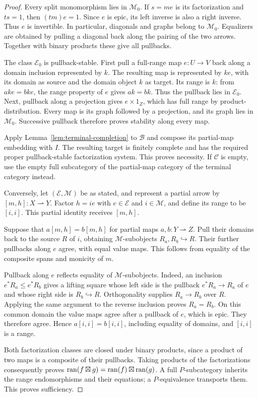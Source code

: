 \documentclass[11pt]{article}
\newcommand{\C}{\mathcal C}\newcommand{\D}{\mathcal D}\newcommand{\B}{\mathcal B}
\begin{document}
\begin{proof}
Every split monomorphism lies in $\mathcal M_0$. If $s=me$ is its factorization and $ts=1$, then $(tm)e=1$. Since $e$ is epic, its left inverse is also a right inverse. Thus $e$ is invertible. In particular, diagonals and graphs belong to $\mathcal M_0$. Equalizers are obtained by pulling a diagonal back along the pairing of the two arrows. Together with binary products these give all pullbacks.

The class $\mathcal E_0$ is pullback-stable. First pull a full-range map $e:U\to V$ back along a domain inclusion represented by $k$. The resulting map is represented by $ke$, with its domain as source and the domain object $k$ as target. Its range is $k$: from $ake=bke$, the range property of $e$ gives $ak=bk$. Thus the pullback lies in $\mathcal E_0$. Next, pullback along a projection gives $e\times1_Z$, which has full range by product-distribution. Every map is its graph followed by a projection, and its graph lies in $\mathcal M_0$. Successive pullback therefore proves stability along every map.

Apply Lemma~\ref{lem:terminal-completion} to $\mathcal B$ and compose its partial-map embedding with $I$. The resulting target is finitely complete and has the required proper pullback-stable factorization system. This proves necessity. If $\C$ is empty, use the empty full subcategory of the partial-map category of the terminal category instead.

Conversely, let $(\mathcal E,\mathcal M)$ be as stated, and represent a partial arrow by $[m,h]:X\rightharpoonup Y$. Factor $h=ie$ with $e\in\mathcal E$ and $i\in\mathcal M$, and define its range to be $[i,i]$. This partial identity receives $[m,h]$.

Suppose that $a[m,h]=b[m,h]$ for partial maps $a,b:Y\rightharpoonup Z$. Pull their domains back to the source $R$ of $i$, obtaining $\mathcal M$-subobjects $R_a,R_b\hookrightarrow R$. Their further pullbacks along $e$ agree, with equal value maps. This follows from equality of the composite spans and monicity of $m$.

Pullback along $e$ reflects equality of $\mathcal M$-subobjects. Indeed, an inclusion $e^*R_a\leq e^*R_b$ gives a lifting square whose left side is the pullback $e^*R_a\to R_a$ of $e$ and whose right side is $R_b\hookrightarrow R$. Orthogonality supplies $R_a\to R_b$ over $R$. Applying the same argument to the reverse inclusion proves $R_a=R_b$. On this common domain the value maps agree after a pullback of $e$, which is epic. They therefore agree. Hence $a[i,i]=b[i,i]$, including equality of domains, and $[i,i]$ is a range.

Both factorization classes are closed under binary products, since a product of two maps is a composite of their pullbacks. Taking products of the factorizations consequently proves
$\operatorname{ran}(f\boxtimes g)=\operatorname{ran}(f)\boxtimes\operatorname{ran}(g)$.
A full $P$-subcategory inherits the range endomorphisms and their equations; a $P$-equivalence transports them. This proves sufficiency.
\end{proof}
\end{document}
